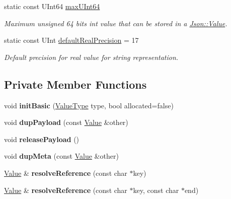 \begin{DoxyCompactItemize}
\mbox{\label{classJson_1_1Value_ae1eb89c305c39516696ff305cffa01da}} 
static const U\+Int64 \hyperlink{classJson_1_1Value_ae1eb89c305c39516696ff305cffa01da}{max\+U\+Int64}
\begin{DoxyCompactList}\small\item\em Maximum unsigned 64 bits int value that can be stored in a \hyperlink{classJson_1_1Value}{Json\+::\+Value}. \end{DoxyCompactList}\item 
\mbox{\label{classJson_1_1Value_aaece556f282980ec2be4b39b9576075f}} 
static const U\+Int \hyperlink{classJson_1_1Value_aaece556f282980ec2be4b39b9576075f}{default\+Real\+Precision} = 17
\begin{DoxyCompactList}\small\item\em Default precision for real value for string representation. \end{DoxyCompactList}\end{DoxyCompactItemize}
\subsection*{Private Member Functions}
\begin{DoxyCompactItemize}
\item 
\mbox{\label{classJson_1_1Value_a32b86b71564157f40f880f5736be822a}} 
void {\bfseries init\+Basic} (\hyperlink{namespaceJson_a7d654b75c16a57007925868e38212b4e}{Value\+Type} type, bool allocated=false)
\item 
\mbox{\label{classJson_1_1Value_a13a986e39651853469b6c3ef39898b0a}} 
void {\bfseries dup\+Payload} (const \hyperlink{classJson_1_1Value}{Value} \&other)
\item 
\mbox{\label{classJson_1_1Value_ac47cca0abfc24071b1c5caa98d752862}} 
void {\bfseries release\+Payload} ()
\item 
\mbox{\label{classJson_1_1Value_a0a277596eda744a8d1ffb6dec43b8627}} 
void {\bfseries dup\+Meta} (const \hyperlink{classJson_1_1Value}{Value} \&other)
\item 
\mbox{\label{classJson_1_1Value_a9ff9cdae2c8f4155bab603d750b0b3f1}} 
\hyperlink{classJson_1_1Value}{Value} \& {\bfseries resolve\+Reference} (const char $\ast$key)
\item 
\mbox{\label{classJson_1_1Value_a5f6b3aaf4f2e952a33dd823db008c333}} 
\hyperlink{classJson_1_1Value}{Value} \& {\bfseries resolve\+Reference} (const char $\ast$key, const char $\ast$end)
\end{DoxyCompactItemize}
